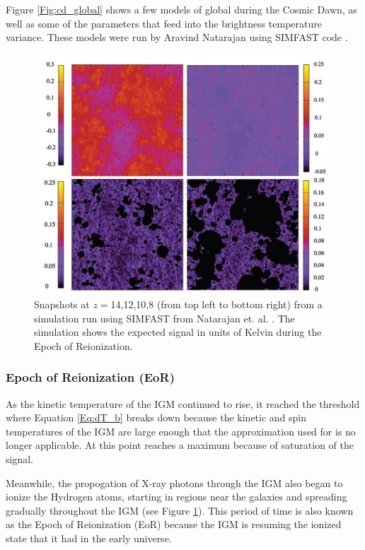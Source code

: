  
Figure \ref{Fig:cd_global} shows a few models of global \dtb during the Cosmic Dawn, as well as some of the parameters that feed into the brightness temperature variance. These models were run by Aravind Natarajan using SIMFAST code \cite{simfast}\cite{21cmfast}\cite{natarajan_2014}.  

\begin{figure}[htb]
\begin{center}
\includegraphics[width=0.95\linewidth]{Introduction/figures/reionization.jpg}
\caption{Snapshots at $z=$14,12,10,8 (from top left to bottom right) from a simulation run using SIMFAST from Natarajan et. al. \cite{natarajan_2014}. The simulation shows the expected \dtb signal in units of Kelvin during the Epoch of Reionization. }
\label{Fig:eor}
\end{center}
\end{figure}

\subsubsection{Epoch of Reionization (EoR)}

As the kinetic temperature of the IGM continued to rise, it reached the threshold where Equation \ref{Eq:dT_b} breaks down because the kinetic and spin temperatures of the IGM are large enough that the approximation used for \tu is no longer applicable. At this point \dtb reaches a maximum because of saturation of the signal. 

Meanwhile, the propogation of X-ray photons through the IGM also began to ionize the Hydrogen atoms, starting in regions near the galaxies and spreading gradually throughout the IGM (see Figure \ref{Fig:eor}). This period of time is also known as the Epoch of Reionization (EoR) because the IGM is resuming the ionized state that it had in the early universe. 

